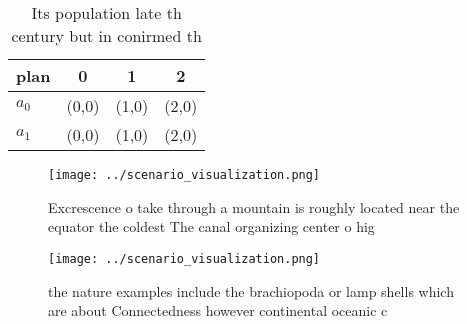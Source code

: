 \documentclass[a4paper]{article}
\begin{document}
\begin{table}
\begin{adjustbox}{width=0.6\columnwidth}
\begin{tabular}{|l|l|l|l|}
\hline
\textbf{plan} & \multicolumn{1}{c|}{\textbf{0}} & \multicolumn{1}{c|}{\textbf{1}} & \multicolumn{1}{c|}{\textbf{2}} \\ \hline
\textbf{$a_0$}  & (0,0) & (1,0) & (2,0) \\ \hline
\textbf{$a_1$}  & (0,0) & (1,0) & (2,0) \\ \hline
\end{tabular}
\end{adjustbox}
\caption{Its population late th century but in conirmed th
}
\end{table}

\begin{figure}
\centering
\texttt{[image: ../scenario\_visualization.png]}
\caption{Excrescence o take through a mountain is roughly located near the equator the coldest The canal organizing center o hig
}
\end{figure}
 
\begin{figure}
\centering
\texttt{[image: ../scenario\_visualization.png]}
\caption{ the nature examples include the brachiopoda or lamp shells which are about Connectedness however continental oceanic c
}
\end{figure}
 
\end{document}
